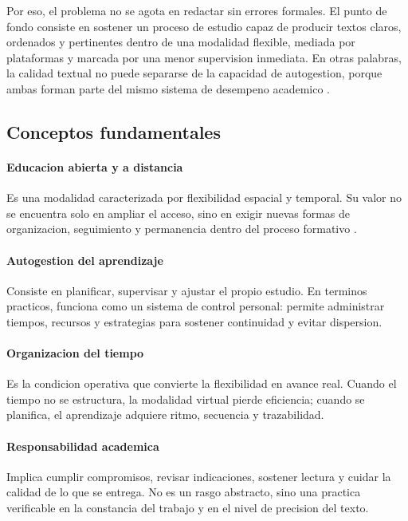 \documentclass[
	spanish,
	letterpaper, oneside
]{article}
\begin{document}
Por eso, el problema no se agota en redactar sin errores formales. El punto de fondo consiste en sostener un proceso de estudio capaz de producir textos claros, ordenados y pertinentes dentro de una modalidad flexible, mediada por plataformas y marcada por una menor supervision inmediata. En otras palabras, la calidad textual no puede separarse de la capacidad de autogestion, porque ambas forman parte del mismo sistema de desempeno academico \citep{vitoriaEscrituraAcademicaFormacion2019,correaManualBasicoEscritura2018}.

\subsection{Conceptos fundamentales}

\paragraph{Educacion abierta y a distancia}
Es una modalidad caracterizada por flexibilidad espacial y temporal. Su valor no se encuentra solo en ampliar el acceso, sino en exigir nuevas formas de organizacion, seguimiento y permanencia dentro del proceso formativo \citep{vitoriaEscrituraAcademicaFormacion2019}.

\paragraph{Autogestion del aprendizaje}
Consiste en planificar, supervisar y ajustar el propio estudio. En terminos practicos, funciona como un sistema de control personal: permite administrar tiempos, recursos y estrategias para sostener continuidad y evitar dispersion.

\paragraph{Organizacion del tiempo}
Es la condicion operativa que convierte la flexibilidad en avance real. Cuando el tiempo no se estructura, la modalidad virtual pierde eficiencia; cuando se planifica, el aprendizaje adquiere ritmo, secuencia y trazabilidad.

\paragraph{Responsabilidad academica}
Implica cumplir compromisos, revisar indicaciones, sostener lectura y cuidar la calidad de lo que se entrega. No es un rasgo abstracto, sino una practica verificable en la constancia del trabajo y en el nivel de precision del texto.
\end{document}
